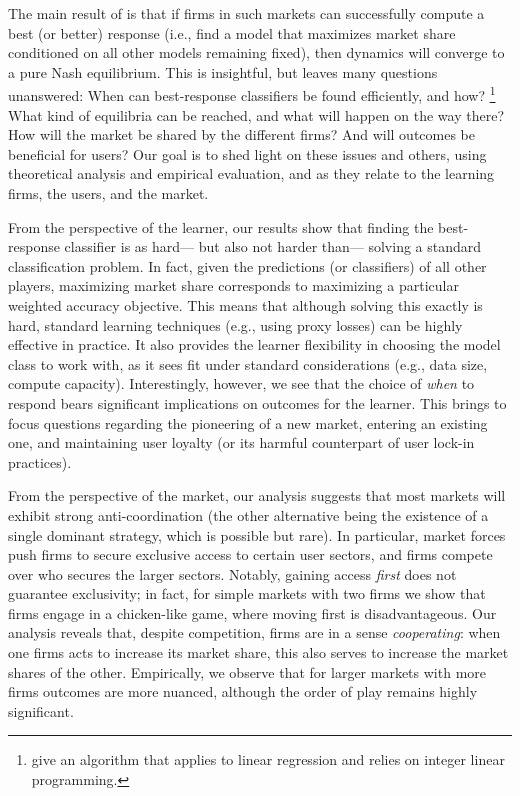 The main result of \citet{ben2019regression} is that if firms in such markets can successfully compute a best (or better) response %
(i.e., find a model that maximizes market share conditioned on all other models remaining fixed), then dynamics will converge to a pure Nash equilibrium.
This is insightful, but leaves many questions unanswered:
When can best-response classifiers be found efficiently, and how?%
\footnote{\citet{ben2019regression} give an algorithm that applies to linear regression and relies on integer linear programming.}
What kind of equilibria can be reached, and what will happen on the way there?
How will the market be shared by the different firms?
And will outcomes be beneficial for users?
Our goal is to shed light on these issues and others,
using theoretical analysis and empirical evaluation,
and as they relate to the learning firms, the users, and the market.
\squeeze

From the perspective of the learner, 
our results show that finding the best-response classifier is as hard---%
but also not harder than---%
solving a standard classification problem.
In fact, given the predictions (or classifiers) of all other players,
maximizing market share corresponds to maximizing a particular weighted accuracy objective.
This means that although solving this exactly is hard,
standard learning techniques (e.g., using proxy losses) can be highly effective in practice.
It also provides the learner flexibility in choosing the model class to work with,
as it sees fit under standard considerations (e.g., data size, compute capacity).
Interestingly, however, we see that the choice of \emph{when} to respond bears significant implications on outcomes for the learner.
This brings to focus questions regarding the pioneering of a new market,
entering an existing one, and maintaining user loyalty
(or its harmful counterpart of user lock-in practices).
\squeeze


From the perspective of the market, 
our analysis suggests that most markets will exhibit strong anti-coordination
(the other alternative being the existence of a single dominant strategy,
which is possible but rare).
In particular, market forces push firms to secure exclusive access to certain user sectors, and firms compete over who secures the larger sectors.
Notably, gaining access \emph{first} does not guarantee exclusivity;
in fact, for simple markets with two firms we show that firms engage in a chicken-like game, where moving first is disadvantageous.
Our analysis reveals
that, despite competition, 
firms are in a sense \emph{cooperating}:
when one firms acts to increase its market share,
this also serves to increase the market shares of the other.
Empirically, we observe that for larger markets with more firms
outcomes are more nuanced,
although the order of play remains highly significant.
\squeeze


